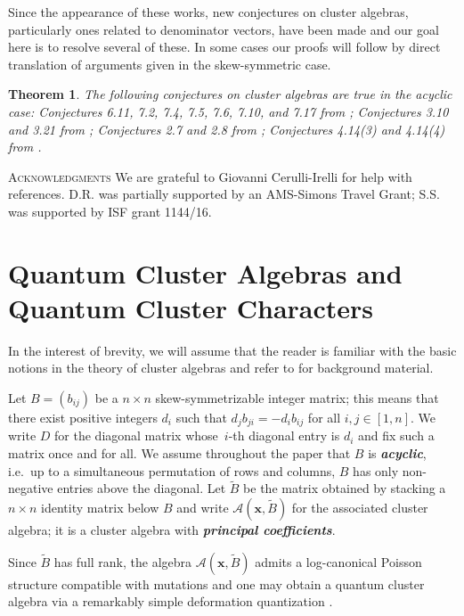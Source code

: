 \documentclass[12pt]{amsart}
\newtheorem{theorem}{Theorem}
\newcommand{\bfx}{\mathbf{x}}
\newcommand{\cA}{\mathcal{A}}
\newcommand{\newword}[1]{\textbf{\emph{#1}}}
\begin{document}
  Since the appearance of these works, new conjectures on cluster algebras, particularly ones related to denominator vectors, have been made and our goal here is to resolve several of these.
  In some cases our proofs will follow by direct translation of arguments given in the skew-symmetric case. 
  \begin{theorem}
    \label{thm:main}
    The following conjectures on cluster algebras are true in the acyclic case: Conjectures 6.11, 7.2, 7.4, 7.5, 7.6, 7.10, and 7.17 from \cite{fomin-zelevinsky4}; Conjectures 3.10 and 3.21 from \cite{reading-speyer}; Conjectures 2.7 and 2.8 from \cite{reading-stella}; Conjectures 4.14(3) and 4.14(4) from \cite{FZ03}.
  \end{theorem}

\textsc{Acknowledgments}
  We are grateful to Giovanni Cerulli-Irelli for help with references.
  D.R. was partially supported by an AMS-Simons Travel Grant; S.S. was supported by ISF grant 1144/16.

\section{Quantum Cluster Algebras and Quantum Cluster Characters}
\label{sec:qca}
  
  In the interest of brevity, we will assume that the reader is familiar with the basic notions in the theory of cluster algebras and refer to \cite{fomin-zelevinsky4} for background material.

  Let $B=(b_{ij})$ be a $n\times n$ skew-symmetrizable integer matrix; this means that there exist positive integers $d_i$ such that $d_jb_{ji}=-d_ib_{ij}$ for all $i,j\in[1,n]$. 
  We write $D$ for the diagonal matrix whose~$i$-th diagonal entry is $d_i$ and fix such a matrix once and for all.
  We assume throughout the paper that $B$ is \newword{acyclic}, i.e.\ up to a simultaneous permutation of rows and columns, $B$ has only non-negative entries above the diagonal.
  Let $\widetilde{B}$ be the matrix obtained by stacking a $n\times n$ identity matrix below $B$ and write $\cA(\bfx,\widetilde{B})$ for the associated cluster algebra; it is a cluster algebra with \newword{principal coefficients}.

  Since $\widetilde{B}$ has full rank, the algebra $\cA(\bfx,\widetilde{B})$ admits a log-canonical Poisson structure compatible with mutations \cite{gekhtman-shapiro-vainshtein} and one may obtain a quantum cluster algebra via a remarkably simple deformation quantization \cite{berenstein-zelevinsky}.  
\end{document}
